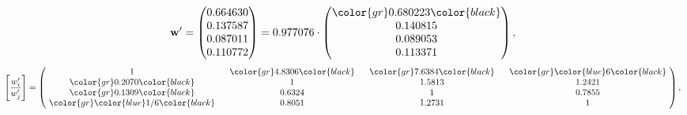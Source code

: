 \begin{example}
\begin{equation*}
\mathbf{w}^{\prime} =
\begin{pmatrix}
0.664630\\
0.137587\\
0.087011\\
0.110772
\end{pmatrix} =
0.977076\cdot
\begin{pmatrix}
\color{gr} 0.680223\color{black} \\
0.140815\\
0.089053\\
0.113371
\end{pmatrix},
\end{equation*}
\begin{equation*}
\left[ \frac{{w}^{\prime}_i}{{w}^{\prime}_j} \right] =
\begin{pmatrix}
$\,\,$ 1 $\,\,$ & $\,\,$\color{gr} 4.8306\color{black} $\,\,$ & $\,\,$\color{gr} 7.6384\color{black} $\,\,$ & $\,\,$\color{gr} \color{blue} 6\color{black} $\,\,$ \\
$\,\,$\color{gr} 0.2070\color{black} $\,\,$ & $\,\,$ 1 $\,\,$ & $\,\,$1.5813$\,\,$ & $\,\,$1.2421  $\,\,$ \\
$\,\,$\color{gr} 0.1309\color{black} $\,\,$ & $\,\,$0.6324$\,\,$ & $\,\,$ 1 $\,\,$ & $\,\,$0.7855 $\,\,$ \\
$\,\,$\color{gr} \color{blue}  1/6\color{black} $\,\,$ & $\,\,$0.8051$\,\,$ & $\,\,$1.2731$\,\,$ & $\,\,$ 1  $\,\,$ \\
\end{pmatrix},
\end{equation*}
\end{example}
\newpage
